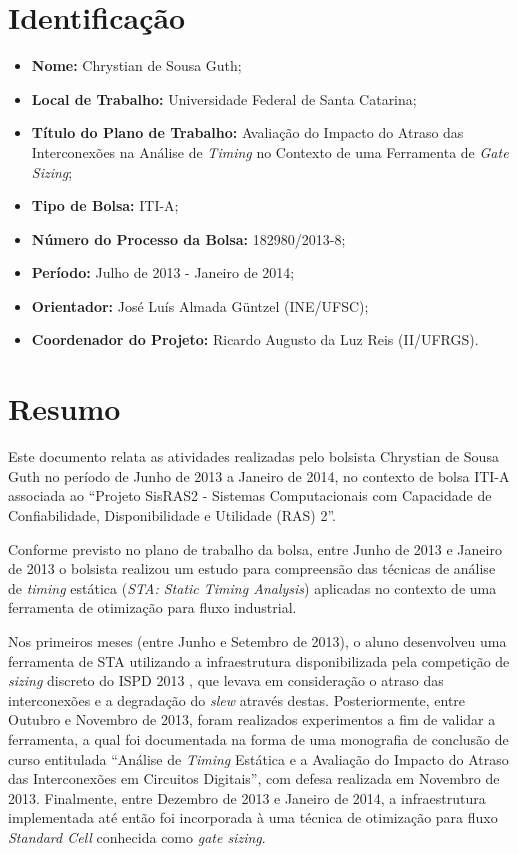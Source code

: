 \documentclass[
	12pt,				%
	openright,			%
	twoside,			%
	a4paper,			%
	english,			%
	french,				%
	spanish,			%
	brazil,				%
	]{abntex2}
\begin{document}
\section{Identificação}

\begin{itemize}
	\item \textbf{Nome:} Chrystian de Sousa Guth;
	\item \textbf{Local de Trabalho:} Universidade Federal de Santa Catarina;
	\item \textbf{Título do Plano de Trabalho:} Avaliação do Impacto do Atraso das Interconexões na Análise de \textit{Timing} no Contexto de uma Ferramenta de \textit{Gate Sizing};
	\item \textbf{Tipo de Bolsa:} ITI-A;
	\item \textbf{Número do Processo da Bolsa:} 182980/2013-8;
	\item \textbf{Período:} Julho de 2013 - Janeiro de 2014;
	\item \textbf{Orientador:} José Luís Almada Güntzel (INE/UFSC);
	\item \textbf{Coordenador do Projeto:} Ricardo Augusto da Luz Reis (II/UFRGS).
\end{itemize}

\section{Resumo}
Este documento relata as atividades realizadas pelo bolsista Chrystian de Sousa Guth no período de Junho de 2013 a Janeiro de 2014, no contexto de bolsa ITI-A associada ao ``Projeto SisRAS2 - Sistemas Computacionais com Capacidade de Confiabilidade, Disponibilidade e Utilidade (RAS) 2''.

Conforme previsto no plano de trabalho da bolsa, entre Junho de 2013 e Janeiro de 2013 o bolsista realizou um estudo para compreensão das técnicas de análise de \textit{timing} estática (\textit{STA: Static Timing Analysis}) aplicadas no contexto de uma ferramenta de otimização para fluxo industrial.

Nos primeiros meses (entre Junho e Setembro de 2013), o aluno desenvolveu uma ferramenta de STA utilizando a infraestrutura disponibilizada pela competição de \textit{sizing} discreto do ISPD 2013 \cite{Contest2013}, que levava em consideração o atraso das interconexões e a degradação do \textit{slew} através destas. Posteriormente, entre Outubro e Novembro de 2013, foram realizados experimentos a fim de validar a ferramenta, a qual foi documentada na forma de uma monografia de conclusão de curso entitulada ``Análise de \textit{Timing} Estática e a Avaliação do Impacto do Atraso das Interconexões em Circuitos Digitais'', com defesa realizada em Novembro de 2013. Finalmente, entre Dezembro de 2013 e Janeiro de 2014, a infraestrutura implementada até então foi incorporada à uma técnica de otimização para fluxo \textit{Standard Cell} conhecida como \textit{gate sizing}.
\end{document}

